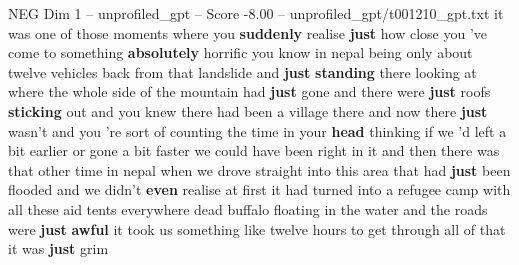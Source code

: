 \begin{textsample}{NEG Dim 1 – unprofiled\_gpt – Score -8.00 – unprofiled\_gpt/t001210\_gpt.txt}  \label{ex:f1_neg_028}
it was one of those moments where you \textbf{suddenly} realise \textbf{just} how close you ’ve come to something \textbf{absolutely} horrific you know in nepal being only about twelve vehicles back from that landslide and \textbf{just} \textbf{standing} there looking at where the whole side of the mountain had \textbf{just} gone and there were \textbf{just} roofs \textbf{sticking} out and you knew there had been a village there and now there \textbf{just} wasn't and you ’re sort of counting the time in your \textbf{head} thinking if we ’d left a bit earlier or gone a bit faster we could have been right in it and then there was that other time in nepal when we drove straight into this area that had \textbf{just} been flooded and we didn't \textbf{even} realise at first it had turned into a refugee camp with all these aid tents everywhere dead buffalo floating in the water and the roads were \textbf{just} \textbf{awful} it took us something like twelve hours to get through all of that it was \textbf{just} grim

\end{textsample}
